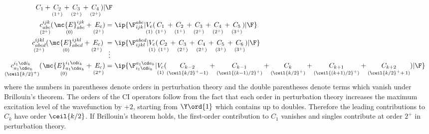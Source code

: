 \begin{rmk}
\begin{align}
{{      C_1
    }
    +
    \underset{(1^+)}{\vphantom{(}
      C_2
    }
    +
    \underset{(2^+)}{\vphantom{(}
      C_3
    }
    +
    \underset{(2^+)}{\vphantom{(}
      C_4
    }
    )
  |\F}
\\
  \underset{(2^+)}{\vphantom{(}
  c_{abc}^{ijk}
  }
  (\hspace{1pt}
  \underset{(0)}{\vphantom{(}
    \mc{E}_{abc}^{ijk}
  }
  +
  \underset{(2^+)}{\vphantom{(}
    E_{\text{c}}
  }
  \hspace{-2pt}
  )
=&\
  \ip{\F_{ijk}^{abc}|
  \underset{(1)}{\vphantom{(}
    V_{\text{c}}
  }
    (
    \underset{(1^+)}{\vphantom{(}
      C_1
    }
    +
    \underset{(1^+)}{\vphantom{(}
      C_2
    }
    +
    \underset{(2^+)}{\vphantom{(}
      C_3
    }
    +
    \underset{(2^+)}{\vphantom{(}
      C_4
    }
    +
    \underset{(3^+)}{\vphantom{(}
      C_5
    }
    )
  |\F}
\\
  \underset{(2^+)}{\vphantom{(}
  c_{abcd}^{ijkl}
  }
  (\hspace{1pt}
  \underset{(0)}{\vphantom{(}
    \mc{E}_{abcd}^{ijkl}
  }
  +
  \underset{(2^+)}{\vphantom{(}
    E_{\text{c}}
  }
  \hspace{-2pt}
  )
\underset{\hspace{2pt}\vdots}{\vphantom{(}
=
}&\
  \ip{\F_{ijkl}^{abcd}|
  \underset{(1)}{\vphantom{(}
    V_{\text{c}}
  }
    (
    \underset{(1^+)}{\vphantom{(}
      C_2
    }
    +
    \underset{(2^+)}{\vphantom{(}
      C_3
    }
    +
    \underset{(2^+)}{\vphantom{(}
      C_4
    }
    +
    \underset{(3^+)}{\vphantom{(}
      C_5
    }
    +
    \underset{(3^+)}{\vphantom{(}
      C_6
    }
    )
  |\F}
\\
\label{eq:ci-k-tuples-equation}
  \underset{(\ceil{k/2}^+)}{\vphantom{(}
  c_{a_1\cd a_k}^{i_1\cd i_k}
  }
  (\hspace{1pt}
  \underset{(0)}{\vphantom{(}
    \mc{E}_{a_1\cd a_k}^{i_1\cd i_k}
  }
  +
  \underset{(2^+)}{\vphantom{(}
    E_{\text{c}}
  }
  \hspace{-2pt}
  )
=&\
  \ip{\F_{i_1\cd i_k}^{a_1\cd a_k}|
  \underset{(1)}{\vphantom{(}
    V_{\text{c}}
  }
    (
    \underset{(\ceil{k/2}^+-1)}{\vphantom{(}
      C_{k-2}
    }
    +
    \underset{(\ceil{(k-1)/2}^+)}{\vphantom{(}
      C_{k-1}
    }
    +
    \underset{(\ceil{k/2}^+)}{\vphantom{(}
      C_k
    }
    +
    \underset{(\ceil{(k+1)/2}^+)}{\vphantom{(}
      C_{k+1}
    }
    +
    \underset{(\ceil{k/2}^++\,1)}{\vphantom{(}
      C_{k+2}
    }
    )
  |\F}
\end{align}
where the numbers in parentheses denote orders in perturbation theory and the double parentheses denote terms which vanish under Brillouin's theorem.
The orders of the CI operators follow from the fact that each order in perturbation theory increases the maximum excitation level of the wavefunction by $+2$, starting from $\Y\ord{1}$ which contains up to doubles.
Therefore the leading contributions to $C_k$ have order $\ceil{k/2}$.
If Brillouin's theorem holds, the first-order contribution to $C_1$ vanishes and singles contribute at order $2^+$ in perturbation theory.
\end{rmk}


